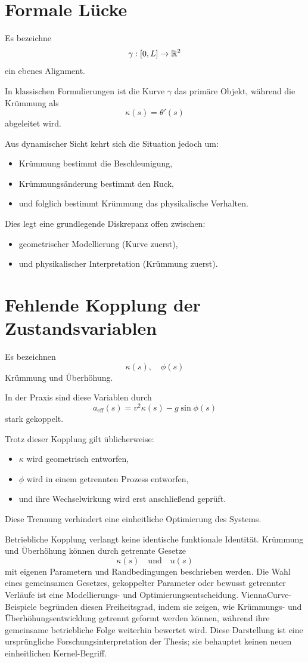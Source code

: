\section{Formale Lücke}

Es bezeichne
\[
\gamma : [0,L] \to \mathbb{R}^2
\]
ein ebenes Alignment.

In klassischen Formulierungen ist die Kurve \(\gamma\) das primäre Objekt,
während die Krümmung als
\[
\kappa(s) = \theta'(s)
\]
abgeleitet wird.

Aus dynamischer Sicht kehrt sich die Situation jedoch um:
\begin{itemize}
\item Krümmung bestimmt die Beschleunigung,
\item Krümmungsänderung bestimmt den Ruck,
\item und folglich bestimmt Krümmung das physikalische Verhalten.
\end{itemize}

Dies legt eine grundlegende Diskrepanz offen zwischen:
\begin{itemize}
\item geometrischer Modellierung (Kurve zuerst),
\item und physikalischer Interpretation (Krümmung zuerst).
\end{itemize}

\section{Fehlende Kopplung der Zustandsvariablen}

Es bezeichnen
\[
\kappa(s), \quad \phi(s)
\]
Krümmung und Überhöhung.

In der Praxis sind diese Variablen durch
\[
a_{\mathrm{eff}}(s) = v^2 \kappa(s) - g \sin\phi(s)
\]
stark gekoppelt.

Trotz dieser Kopplung gilt üblicherweise:
\begin{itemize}
\item \(\kappa\) wird geometrisch entworfen,
\item \(\phi\) wird in einem getrennten Prozess entworfen,
\item und ihre Wechselwirkung wird erst anschließend geprüft.
\end{itemize}

Diese Trennung verhindert eine einheitliche Optimierung des Systems.

Betriebliche Kopplung verlangt keine identische funktionale Identität.
Krümmung und Überhöhung können durch getrennte Gesetze
\[
\kappa(s) \quad\text{und}\quad u(s)
\]
mit eigenen Parametern und Randbedingungen beschrieben werden. Die Wahl eines
gemeinsamen Gesetzes, gekoppelter Parameter oder bewusst getrennter Verläufe
ist eine Modellierungs- und Optimierungsentscheidung. ViennaCurve-Beispiele
begründen diesen Freiheitsgrad, indem sie zeigen, wie Krümmungs- und
Überhöhungsentwicklung getrennt geformt werden können, während ihre gemeinsame
betriebliche Folge weiterhin bewertet wird. Diese Darstellung ist eine
ursprüngliche Forschungsinterpretation der Thesis; sie behauptet keinen neuen
einheitlichen Kernel-Begriff.

